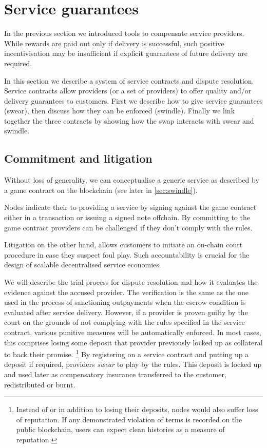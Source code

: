 \section{Service guarantees}
\label{sec:courtroom}

In the previous section we introduced tools to compensate service providers.
While rewards are paid out only if delivery is successful, such positive incentivisation may be insufficient if explicit guarantees of future delivery are required.

In this section we describe a system of service contracts and dispute resolution.
Service contracts allow providers (or a set of providers) to offer quality and/or delivery guarantees to customers. First we describe how to give service guarantees (swear), then discuss how they can be enforced (swindle). Finally we link together the three contracts by showing how the swap interacts with swear and swindle.


\subsection{Commitment and litigation}

Without loss of generality, we can conceptualise a generic service as described by a game contract on the blockchain (see later in \ref{sec:swindle}).


Nodes indicate their  to providing a service by signing against the game contract either in a transaction or issuing a signed note offchain. By committing to the game contract  providers can be challenged if they don't comply with the rules.

Litigation on the other hand, allows customers to initiate an on-chain court procedure in case they suspect foul play. Such accountability is crucial for the design of scalable decentralised service economies.

We will describe the trial process for dispute resolution and how it evaluates the evidence against the accused provider. The verification is the same as the one used in the process of sanctioning outpayments when the escrow condition is evaluated after service delivery. However, if a provider is proven guilty by the court on the grounds of not complying with the rules specified in the service contract, various punitive measures will be automatically enforced. In most cases, this comprises losing some deposit that provider previously locked up as collateral to back their promise.%
%
\footnote{Instead of or in addition to losing their deposits, nodes would also suffer loss of reputation. If any demonstrated violation of terms is recorded on the public blockchain, users can expect clean histories as a measure of reputation.}
%
By registering on a service contract and putting up a deposit if required, providers \emph{swear} to play by the rules. This deposit is locked up and used later as compensatory insurance transferred to the customer, redistributed or burnt.

